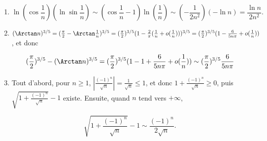 {{\begin{enumerate}
$$(1+\sqrt{n})^{-\sqrt{n}}=e^{-\sqrt{n}\ln(\sqrt{n})-1+o(1)}\sim e^{-\sqrt{n}\ln(\sqrt{n})-1}=\frac{1}{e}\frac{1}{\sqrt{n}^{\sqrt{n}}}.$$
\item 

$$\ln(\cos\frac{1}{n})(\ln\sin\frac{1}{n})\sim(\cos\frac{1}{n}-1)\ln(\frac{1}{n})\sim(-\frac{1}{2n^2})(-\ln n)=\frac{\ln n}{2n^2}.$$

\item  $(\Arctan n)^{3/5}=(\frac{\pi}{2}-\Arctan\frac{1}{n})^{3/5}=(\frac{\pi}{2})^{3/5}(1-\frac{2}{\pi}(\frac{1}{n}+o(\frac{1}{n})))^{3/5}=(\frac{\pi}{2})^{3/5}(1-\frac{6}{5n\pi}+o(\frac{1}{n}))$, et donc

$$(\frac{\pi}{2})^{3/5}-(\Arctan n)^{3/5}=(\frac{\pi}{2})^{3/5}(1-1+\frac{6}{5n\pi}+o(\frac{1}{n}))
\sim(\frac{\pi}{2})^{3/5}\frac{6}{5n\pi}$$

\item  Tout d'abord, pour $n\geq1$, $\left|\frac{(-1)^n}{\sqrt{n}}\right|=\frac{1}{\sqrt{n}}\leq 1$, et donc $1+\frac{(-1)^n}{\sqrt{n}}\geq0$, puis $\sqrt{1+\frac{(-1)^n}{\sqrt{n}}}-1$ existe. Ensuite, quand $n$ tend vers $+\infty$,

$$\sqrt{1+\frac{(-1)^n}{\sqrt{n}}}-1\sim\frac{(-1)^n}{2\sqrt{n}}.$$
\end{enumerate}}
}